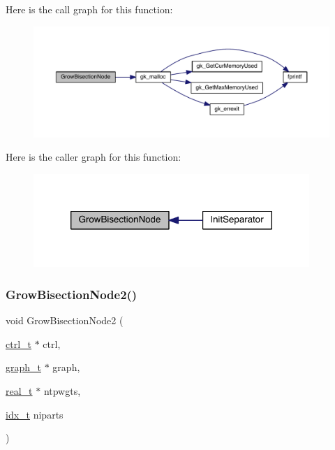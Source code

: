 Here is the call graph for this function\+:\nopagebreak
\begin{figure}[H]
\begin{center}
\leavevmode
\includegraphics[width=350pt]{a00903_a5882ab0f565a5e97581ad5c4847effbc_cgraph}
\end{center}
\end{figure}
Here is the caller graph for this function\+:\nopagebreak
\begin{figure}[H]
\begin{center}
\leavevmode
\includegraphics[width=296pt]{a00903_a5882ab0f565a5e97581ad5c4847effbc_icgraph}
\end{center}
\end{figure}
\mbox{\label{a00903_a3668b93d256689991e65a85536f533c5}} 
\subsubsection{\texorpdfstring{Grow\+Bisection\+Node2()}{GrowBisectionNode2()}}
{\footnotesize\ttfamily void Grow\+Bisection\+Node2 (\begin{DoxyParamCaption}\item[{\hyperlink{a00742}{ctrl\+\_\+t} $\ast$}]{ctrl,  }\item[{\hyperlink{a00734}{graph\+\_\+t} $\ast$}]{graph,  }\item[{\hyperlink{a00876_a1924a4f6907cc3833213aba1f07fcbe9}{real\+\_\+t} $\ast$}]{ntpwgts,  }\item[{\hyperlink{a00876_aaa5262be3e700770163401acb0150f52}{idx\+\_\+t}}]{niparts }\end{DoxyParamCaption})}

